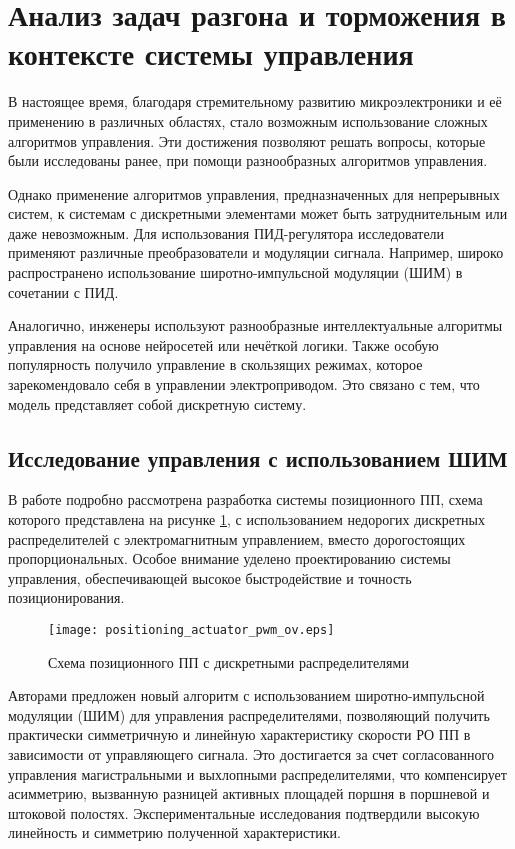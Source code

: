 
\section{Анализ задач разгона и торможения в контексте системы управления}\label{sec:ch1/sec5}
В настоящее время, благодаря стремительному развитию микроэлектроники и её применению в различных
областях, стало возможным использование сложных алгоритмов управления. Эти достижения позволяют решать
вопросы, которые были исследованы ранее, при помощи разнообразных алгоритмов управления.

Однако применение алгоритмов управления, предназначенных для непрерывных систем, к системам с
дискретными элементами может быть затруднительным или даже невозможным. Для использования
ПИД-регулятора исследователи применяют различные преобразователи и модуляции сигнала. Например,
широко распространено использование широтно-импульсной модуляции (ШИМ) в сочетании с ПИД.

Аналогично, инженеры используют разнообразные интеллектуальные алгоритмы управления на основе
нейросетей или нечёткой логики. Также особую популярность получило управление в скользящих режимах,
которое зарекомендовало себя в управлении электроприводом. Это связано с тем, что модель представляет
собой дискретную систему.

\subsection{Исследование управления с использованием ШИМ}\label{subsec:ch1/sec5/subsec1}

В работе \cite*{pwm:Varseveld} подробно рассмотрена разработка системы позиционного ПП, схема которого представлена на
рисунке \ref*{fig:позиционный_пп_pwm}, с использованием недорогих
дискретных распределителей с электромагнитным управлением, вместо дорогостоящих пропорциональных. Особое внимание уделено
проектированию системы управления, обеспечивающей высокое быстродействие и точность позиционирования.

\begin{figure}[htpb]
    \centerfloat
    \texttt{[image: positioning\_actuator\_pwm\_ov.eps]}
    \caption{Схема позиционного ПП с дискретными распределителями}\label{fig:позиционный_пп_pwm}
\end{figure}

Авторами предложен новый алгоритм с использованием широтно-импульсной модуляции (ШИМ) для управления распределителями, позволяющий
получить практически симметричную и линейную характеристику скорости РО ПП в зависимости от управляющего сигнала.
Это достигается за счет согласованного управления магистральными и выхлопными распределителями, что компенсирует асимметрию,
вызванную разницей активных площадей поршня в поршневой и штоковой полостях. Экспериментальные исследования подтвердили высокую линейность и
симметрию полученной характеристики.

